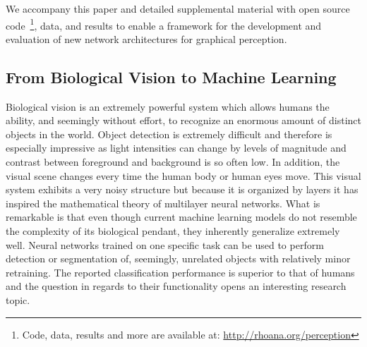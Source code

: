 We accompany this paper and detailed supplemental material with open source code~\footnote{Code, data, results and more are available at: \url{http://rhoana.org/perception}}, data, and results to enable a framework for the development and evaluation of new network architectures for graphical perception.


%

\subsection{From Biological Vision to Machine Learning}


Biological vision is an extremely powerful system which allows humans the ability, and seemingly without effort, to recognize an enormous amount of distinct objects in the world. 
Object detection is extremely difficult and therefore is especially impressive as light intensities can change by levels of magnitude and contrast between foreground and background is so often low. 
In addition, the visual scene changes every time the human body or human eyes move. 
This visual system exhibits a very noisy structure but because it is organized by layers it has inspired the mathematical theory of multilayer neural networks. 
What is remarkable is that even though current machine learning models do not resemble the complexity of its biological pendant, they inherently generalize extremely well. 
Neural networks trained on one specific task can be used to perform detection or segmentation of, seemingly, unrelated objects with relatively minor retraining. 
The reported classification performance is superior to that of humans and the question in regards to their functionality opens an interesting research topic.

